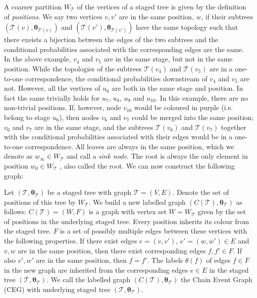 \documentclass[runningheads]{llncs}
\begin{document}
A coarser partition $W_{\mathcal{T}}$ of the vertices of a staged tree is given by the definition of \emph{positions}. We say two vertices $v, v'$ are in the same position, $w$, if their subtrees $(\mathcal{T}(v), \boldsymbol{\theta}_{\mathcal{T}(v)})$ and $(\mathcal{T}(v'), \boldsymbol{\theta}_{\mathcal{T}(v')})$ have the same topology such that there exeists a bijection between the edges of the two subtrees and the conditional probabilities associated with the corresponding edges are the same. \\
In the above example, $v_4$ and $v_5$ are in the same stage, but not in the same position. While the topologies of the subtrees $\mathcal{T}(v_4)$ and $\mathcal{T}(v_5)$ are in a one-to-one correspondence, the conditional probabilities downstream of $v_4$ and $v_5$ are not. However, all the vertices of $u_6$ are both in the same stage and position. In fact the same trivially holds for $u_7$, $u_8$, $u_9$ and $u_{10}$. 
In this example, there are no non-trivial positions. If, however, node $v_{16}$ would be coloured in purple (i.e. belong to stage $u_6$), then nodes $v_6$ and $v_7$ could be merged into the same position; $v_6$ and $v_7$ are in the same stage, and the subtrees $\mathcal{T}(v_6)$ and $\mathcal{T}(v_7)$ together with the conditional probabilities associated with their edges would be in a one-to-one correspondence. 
All leaves are always in the same position, which we denote as $w_\infty \in W_{\mathcal{T}}$ and call a \emph{sink node}. The root is always the only element in position $w_0 \in W_{\mathcal{T}}$ , also called the root. We can now construct the following graph:
\begin{definition}
Let $(\mathcal{T} , \boldsymbol{\theta}_{\mathcal{T}})$ be a staged tree with graph $\mathcal{T} = (V, E)$. Denote the set of positions of this tree by $W_{\mathcal{T}}$. We build a new labelled graph $(C(\mathcal{T}) , \boldsymbol{\theta}_{\mathcal{T}})$ as follows:
$C(\mathcal{T}) = (W, F)$ is a graph with vertex set $W = W_{\mathcal{T}}$ given by the set of positions in the underlying staged tree. Every position inherits its colour from the staged tree. $F$ is a set of possibly multiple edges between these vertices with the following properties. If there exist edges $e = (v, v')$, $e' = (w, w') \in E$ and $v, w$ are in the same position, then there exist corresponding edges $f, f' \in F$. If also $v', w'$ are in the same position, then $f = f'$. The labels $\theta(f)$ of edges $f \in F$ in the new graph are inherited from the corresponding edges $e \in E$ in the staged tree $(\mathcal{T} , \boldsymbol{\theta}_{\mathcal{T}})$.
We call the labelled graph $(C(\mathcal{T}) , \boldsymbol{\theta}_{\mathcal{T}})$ the Chain Event Graph (CEG) with underlying staged tree $(\mathcal{T} , \boldsymbol{\theta}_{\mathcal{T}})$.
\end{definition}
\end{document}
